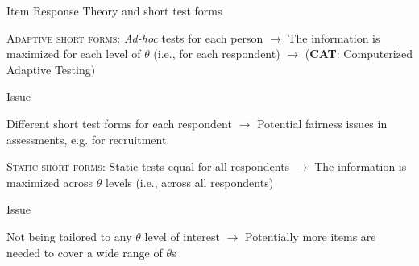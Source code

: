 \documentclass{beamer} %
\begin{document}
\begin{frame}{Item Response Theory and short test forms}

\textsc{\textcolor{template}{Adaptive short forms}}: \emph{Ad-hoc} tests for each person \textcolor{template}{$\rightarrow$} The information is maximized for each level of $\theta$ (i.e., for each respondent) \textcolor{template}{$\rightarrow$} (\textcolor{template}{\textbf{CAT}}: Computerized Adaptive Testing)
		
		\begin{alertblock}{Issue}
			
		Different short test forms for each respondent $\rightarrow$ Potential fairness issues in assessments, e.g. for recruitment
		\end{alertblock}
		
\textcolor{template}{\textsc{Static short forms}}: Static tests equal for all respondents \textcolor{template}{$\rightarrow$} The information is maximized across $\theta$ levels (i.e., across all respondents)
		
		\begin{alertblock}{Issue}
		
		Not being tailored to any $\theta$ level of interest \textcolor{template}{$\rightarrow$} Potentially more items are needed to  cover a wide range of $\theta$s
		\end{alertblock}


\end{frame}
\end{document}
